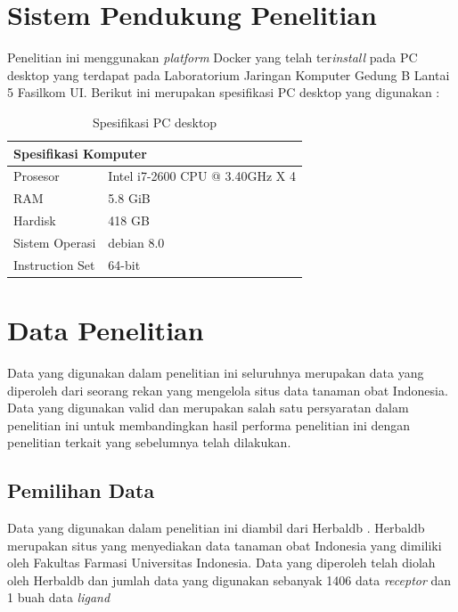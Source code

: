 \section{Sistem Pendukung Penelitian}
\hspace{0.5cm}Penelitian ini menggunakan \textit{platform} Docker yang telah ter\textit{install} pada PC desktop yang terdapat pada Laboratorium Jaringan Komputer Gedung B Lantai 5 Fasilkom UI. Berikut ini merupakan spesifikasi PC desktop yang digunakan :
\begin{table}
	\centering
	\begin{tabular}{|l|l|l|l|l|}
		\hline
		\multicolumn{5}{|l|}{Spesifikasi Komputer} \\ \hline
		\multicolumn{2}{|l|}{Prosesor} & \multicolumn{3}{l|}{Intel i7-2600 CPU @ 3.40GHz X 4} \\ \hline
		\multicolumn{2}{|l|}{RAM} & \multicolumn{3}{l|}{5.8 GiB} \\ \hline
		\multicolumn{2}{|l|}{Hardisk} & \multicolumn{3}{l|}{418 GB} \\ \hline
		\multicolumn{2}{|l|}{Sistem Operasi} & \multicolumn{3}{l|}{debian 8.0} \\ \hline
		\multicolumn{2}{|l|}{Instruction Set} & \multicolumn{3}{l|}{64-bit} \\ \hline
	\end{tabular}
	\caption{Spesifikasi PC desktop}
	\label{my-label}
\end{table}
\section{Data Penelitian}
\hspace{0.5cm}Data yang digunakan dalam penelitian ini seluruhnya merupakan data yang diperoleh dari seorang rekan yang mengelola situs data tanaman obat Indonesia. Data yang digunakan valid dan merupakan salah satu persyaratan dalam penelitian ini untuk membandingkan hasil performa penelitian ini dengan penelitian terkait yang sebelumnya telah dilakukan. 
\subsection{Pemilihan Data}
\hspace{0.5cm}Data yang digunakan dalam penelitian ini diambil dari Herbaldb \cite{herbaldb}. Herbaldb merupakan situs yang menyediakan data tanaman obat Indonesia yang dimiliki oleh Fakultas Farmasi Universitas Indonesia. Data yang diperoleh telah diolah oleh Herbaldb dan jumlah data yang digunakan sebanyak 1406 data \textit{receptor} dan 1 buah data \textit{ligand}
